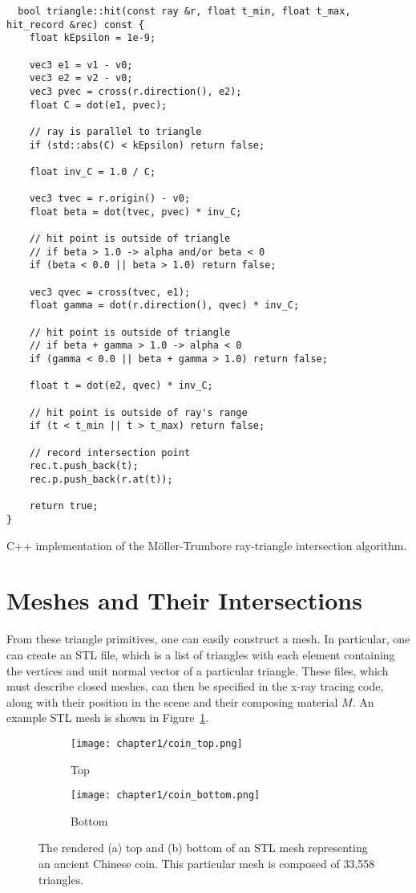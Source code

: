 \begin{listing}
\begin{verbatim}
  bool triangle::hit(const ray &r, float t_min, float t_max, hit_record &rec) const {
    float kEpsilon = 1e-9;

    vec3 e1 = v1 - v0;
    vec3 e2 = v2 - v0;
    vec3 pvec = cross(r.direction(), e2);
    float C = dot(e1, pvec);

    // ray is parallel to triangle
    if (std::abs(C) < kEpsilon) return false; 

    float inv_C = 1.0 / C;

    vec3 tvec = r.origin() - v0;
    float beta = dot(tvec, pvec) * inv_C;

    // hit point is outside of triangle
    // if beta > 1.0 -> alpha and/or beta < 0
    if (beta < 0.0 || beta > 1.0) return false;

    vec3 qvec = cross(tvec, e1);
    float gamma = dot(r.direction(), qvec) * inv_C;

    // hit point is outside of triangle
    // if beta + gamma > 1.0 -> alpha < 0
    if (gamma < 0.0 || beta + gamma > 1.0) return false;

    float t = dot(e2, qvec) * inv_C;

    // hit point is outside of ray's range
    if (t < t_min || t > t_max) return false;

    // record intersection point
    rec.t.push_back(t); 
    rec.p.push_back(r.at(t));

    return true;
}
\end{verbatim}
\caption{C++ implementation of the Möller-Trumbore ray-triangle intersection algorithm.}
\label{lst:tri_intersect_alg}
\end{listing}

\section{Meshes and Their Intersections}
From these triangle primitives, one can easily construct a mesh. In particular, one can create an STL file, which is a list of triangles with each element containing the vertices and unit normal vector of a particular triangle. These files, which must describe closed meshes, can then be specified in the x-ray tracing code, along with their position in the scene and their composing material $M$. An example STL mesh is shown in Figure~\ref{fig:coin_mesh_render}.

\begin{figure}[htb!]
  \centering
  \begin{subfigure}[b]{0.45\textwidth}
      \texttt{[image: chapter1/coin\_top.png]}
      \caption{Top}
  \end{subfigure}
  \hfill %
  \begin{subfigure}[b]{0.45\textwidth}
      \texttt{[image: chapter1/coin\_bottom.png]}
      \caption{Bottom}
  \end{subfigure}
  \caption{The rendered (a) top and (b) bottom of an STL mesh representing an ancient Chinese coin. This particular mesh is composed of 33,558 triangles.}
  \label{fig:coin_mesh_render}
\end{figure}

